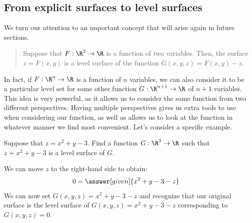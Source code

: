 \documentclass{ximera}
\begin{document}



\subsection{From explicit surfaces to level surfaces}

We turn our attention to an important concept that will arise again in
future sections.

\begin{quote}
Suppose that $F:\R^2 \to \R$ is a function of two variables.  Then, the surface $z = F(x,y)$ is a level surface of the function $G(x,y,z) = F(x,y) - z.$
\end{quote}

In fact, if $F: \R^n \to \R$ is a function of $n$ variables, we can also consider it to be a particular level set for some other function $G: \R^{n+1} \to \R$ of $n+1$ variables.  This idea is very powerful, as it allows us to consider the same function 
from two different perspectives.  Having multiple perspectives gives us extra tools 
to use when considering our function, as well as allows us to look at the function 
in whatever manner we find most convenient.  Let's consider a specific example.

\begin{example}
  Suppose that $z=x^2+y-3$. Find a function $G:\R^3\to\R$ such that
  $z=x^2+y-3$ is a level surface of $G$.
  \begin{explanation}
    We can move $z$ to the right-hand side to obtain:
    \[
    0 = \answer[given]{x^2+y-3-z}
    \]
    We can now set $G(x,y,z) = x^2+y-3-z$ and recognize that our
    original surface is the level surface of $G(x,y,z) = x^2+y-3-z$
    corresponding to $G(x,y,z)=0$.
  \end{explanation}
\end{example}
\end{document}
